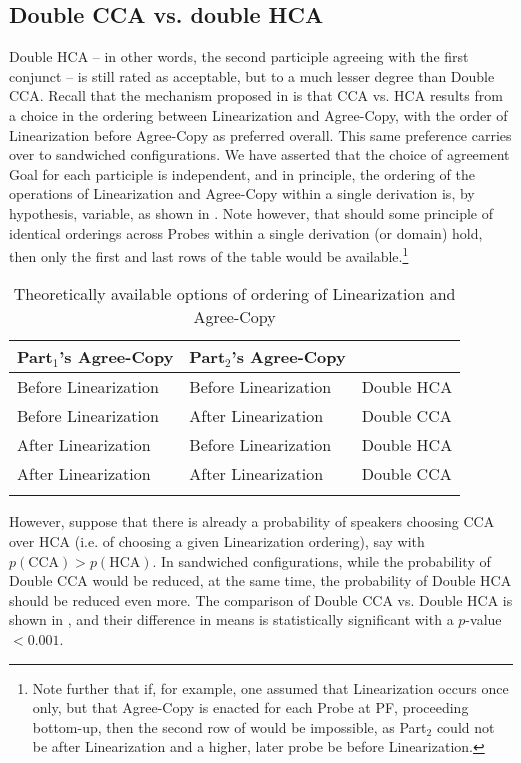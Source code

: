 \documentclass[output=paper
,modfonts
,nonflat]{langsci/langscibook}
\begin{document}
\subsection{Double CCA vs. double HCA}\largerpage[2]
Double HCA -- in other words, the second participle agreeing with the first conjunct -- is still rated as acceptable, but to a much lesser degree than Double CCA.  Recall that the mechanism proposed in \citet{marusicnevinsbadecker:15} is that CCA vs. HCA results from a choice in the ordering between Linearization and Agree-Copy, with the order of Linearization before Agree-Copy as preferred overall. This same preference carries over to sandwiched configurations. We have asserted that the choice of agreement Goal for each participle is independent, and in principle, the ordering of the operations of Linearization and Agree-Copy within a single derivation is, by hypothesis, variable, as shown in . Note however, that should some principle of identical orderings across Probes within a single derivation (or domain) hold, then only the first and last rows of the table would be available.{\footnote{Note further that if, for example, one assumed that Linearization occurs once only, but that Agree-Copy is enacted for each Probe at PF, proceeding bottom-up, then the second row of  would be impossible, as Part$_2$ could not be after Linearization and a higher, later probe be before Linearization.}}

\begin{table}
\begin{tabular}{lll} 
	\lsptoprule
Part$_1$'s Agree-Copy &  Part$_2$'s Agree-Copy &\\ \midrule
Before Linearization & Before Linearization & Double HCA\\ 
Before Linearization & After Linearization& Double CCA\\ 
After Linearization & Before Linearization& Double HCA\\ 
After Linearization & After Linearization& Double CCA\\ 
\lspbottomrule
\end{tabular}
\caption{Theoretically available options of ordering of Linearization and Agree-Copy\label{tab:order}}
\end{table}

However, suppose that there is already a probability of speakers choosing CCA over HCA (i.e. of choosing a given Linearization ordering), say with $p(\text{CCA}) > p(\text{HCA})$. In sandwiched configurations, while the probability of Double CCA would be reduced, at the same time, the probability of Double HCA should be reduced even more. 
The comparison of Double CCA vs. Double HCA is shown in , and their difference in means is statistically significant with a $p$-value $<0.001$.
\end{document}
